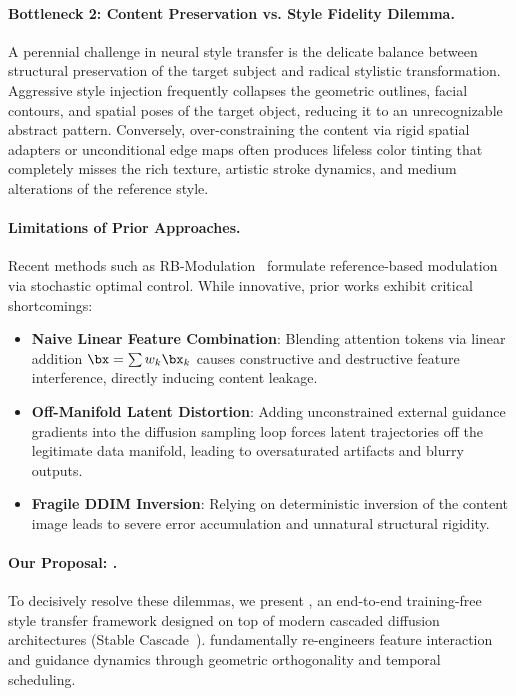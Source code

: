 \paragraph{Bottleneck 2: Content Preservation vs. Style Fidelity Dilemma.}
A perennial challenge in neural style transfer is the delicate balance between structural preservation of the target subject and radical stylistic transformation. Aggressive style injection frequently collapses the geometric outlines, facial contours, and spatial poses of the target object, reducing it to an unrecognizable abstract pattern. Conversely, over-constraining the content via rigid spatial adapters or unconditional edge maps often produces lifeless color tinting that completely misses the rich texture, artistic stroke dynamics, and medium alterations of the reference style.

\paragraph{Limitations of Prior Approaches.}
Recent methods such as RB-Modulation~\cite{rout2024rbmodulation} formulate reference-based modulation via stochastic optimal control. While innovative, prior works exhibit critical shortcomings:
\begin{itemize}
    \item \textbf{Naive Linear Feature Combination}: Blending attention tokens via linear addition $\bx = \sum w_k \bx_k$ causes constructive and destructive feature interference, directly inducing content leakage.
    \item \textbf{Off-Manifold Latent Distortion}: Adding unconstrained external guidance gradients into the diffusion sampling loop forces latent trajectories off the legitimate data manifold, leading to oversaturated artifacts and blurry outputs.
    \item \textbf{Fragile DDIM Inversion}: Relying on deterministic inversion of the content image leads to severe error accumulation and unnatural structural rigidity.
\end{itemize}

\paragraph{Our Proposal: \method.}
To decisively resolve these dilemmas, we present \textbf{\method}, an end-to-end training-free style transfer framework designed on top of modern cascaded diffusion architectures (Stable Cascade~\cite{pernias2023stablecascade}). \method fundamentally re-engineers feature interaction and guidance dynamics through geometric orthogonality and temporal scheduling.

